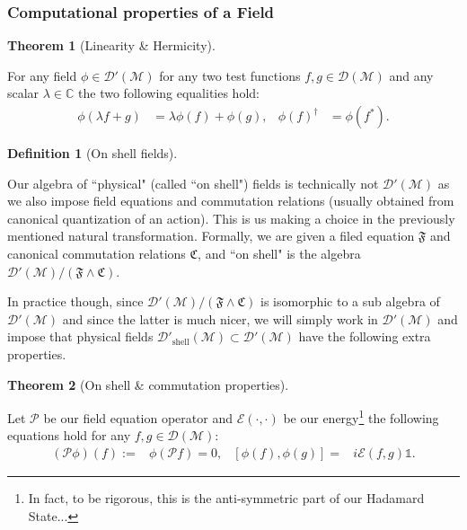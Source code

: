 \documentclass[a4paper,11pt]{article}
\numberwithin{equation}{section}
\theoremstyle{definition}
\newtheorem{definition}{Definition}
\newtheorem{theorem}{Theorem}
\begin{document}
\subsubsection{Computational properties of a Field}
        \begin{theorem}[Linearity \& Hermicity]$\quad$
        
         For any field $\phi\in\mathcal{D}'(\mathcal{M})$ for any two test functions $f,g\in\mathcal{D}(\mathcal{M})$ and any scalar $\lambda\in\mathbb{C}$  the two following equalities hold:
         \begin{align}
             \phi(\lambda f+ g) &= \lambda\phi(f)+ \phi(g),&
             \phi(f)^\dag &= \phi(f^*).
         \end{align}
        \end{theorem}
        \begin{definition}[On shell fields]$\quad$

        Our algebra of ``physical" (called ``on shell") fields is technically not $\mathcal{D}'(\mathcal{M})$ as we also impose field equations and commutation relations (usually obtained from canonical quantization of an action). This is us making a choice in the previously mentioned natural transformation. Formally, we are given a filed equation $\mathfrak{F}$ and canonical commutation relations $\mathfrak{C}$, and ``on shell" is the algebra $\mathcal{D}'(\mathcal{M})/(\mathfrak{F}\wedge\mathfrak{C})$.

        In practice though, since $\mathcal{D}'(\mathcal{M})/(\mathfrak{F}\wedge\mathfrak{C})$ is isomorphic to a sub algebra of $\mathcal{D}'(\mathcal{M})$ and since the latter is much nicer, we will simply work in $\mathcal{D}'(\mathcal{M})$ and impose that physical fields $\mathcal{D}'_\mathrm{shell}(\mathcal{M})\subset\mathcal{D}'(\mathcal{M})$ have the following extra properties.
        \end{definition}
        
        \begin{theorem}[On shell \& commutation properties]$\quad$
        
        Let $\mathcal{P}$ be our field equation operator and $\mathcal{E}(\cdot,\cdot)$ be our energy\footnote{In fact, to be rigorous, this is the anti-symmetric part of our Hadamard State...} the following equations hold for any $f,g\in\mathcal{D}(\mathcal{M})$:
        \begin{align}
            (\mathcal{P}\phi)(f):=&\phi(\mathcal{P}f)=0, &
            [\phi(f),\phi(g)]=&i\mathcal{E}(f,g)\mathds{1}.
        \end{align}            
        \end{theorem}
\end{document}
